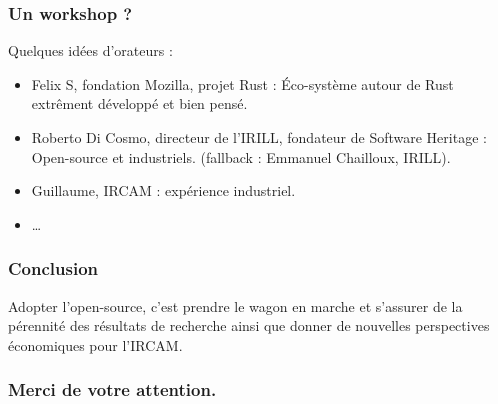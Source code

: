 \documentclass[xcolor=dvipsnames]{beamer}
\begin{document}
\begin{frame}
\frametitle{Un workshop ?}
Quelques idées d'orateurs :
\begin{itemize}
\item Felix S, fondation Mozilla, projet Rust : Éco-système autour de Rust extrêment développé et bien pensé.
\item Roberto Di Cosmo, directeur de l'IRILL, fondateur de Software Heritage : Open-source et industriels. (fallback : Emmanuel Chailloux, IRILL).
\item Guillaume, IRCAM : expérience industriel.
\item \ldots
\end{itemize}
\end{frame}

\begin{frame}
\frametitle{Conclusion}

Adopter l'open-source, c'est prendre le wagon en marche et s'assurer de la pérennité des résultats de recherche ainsi que donner de nouvelles perspectives économiques pour l'IRCAM.

\end{frame}

\begin{frame}
\frametitle{Merci de votre attention.}
\begin{center}
\end{center}
\end{frame}
\end{document}
